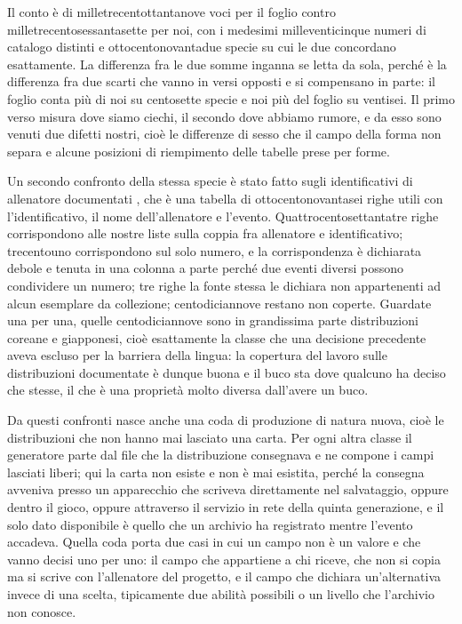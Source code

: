 Il conto è di milletrecentottantanove voci per il foglio contro milletrecentosessantasette per noi, con i medesimi milleventicinque numeri di catalogo distinti e ottocentonovantadue specie su cui le due concordano esattamente. La differenza fra le due somme inganna se letta da sola, perché è la differenza fra due scarti che vanno in versi opposti e si compensano in parte: il foglio conta più di noi su centosette specie e noi più del foglio su ventisei. Il primo verso misura dove siamo ciechi, il secondo dove abbiamo rumore, e da esso sono venuti due difetti nostri, cioè le differenze di sesso che il campo della forma non separa e alcune posizioni di riempimento delle tabelle prese per forme.

Un secondo confronto della stessa specie è stato fatto sugli identificativi di allenatore documentati \cite{bulbapedia-id-notevoli}, che è una tabella di ottocentonovantasei righe utili con l'identificativo, il nome dell'allenatore e l'evento. Quattrocentosettantatre righe corrispondono alle nostre liste sulla coppia fra allenatore e identificativo; trecentouno corrispondono sul solo numero, e la corrispondenza è dichiarata debole e tenuta in una colonna a parte perché due eventi diversi possono condividere un numero; tre righe la fonte stessa le dichiara non appartenenti ad alcun esemplare da collezione; centodiciannove restano non coperte. Guardate una per una, quelle centodiciannove sono in grandissima parte distribuzioni coreane e giapponesi, cioè esattamente la classe che una decisione precedente aveva escluso per la barriera della lingua: la copertura del lavoro sulle distribuzioni documentate è dunque buona e il buco sta dove qualcuno ha deciso che stesse, il che è una proprietà molto diversa dall'avere un buco.

Da questi confronti nasce anche una coda di produzione di natura nuova, cioè le distribuzioni che non hanno mai lasciato una carta. Per ogni altra classe il generatore parte dal file che la distribuzione consegnava e ne compone i campi lasciati liberi; qui la carta non esiste e non è mai esistita, perché la consegna avveniva presso un apparecchio che scriveva direttamente nel salvataggio, oppure dentro il gioco, oppure attraverso il servizio in rete della quinta generazione, e il solo dato disponibile è quello che un archivio ha registrato mentre l'evento accadeva. Quella coda porta due casi in cui un campo non è un valore e che vanno decisi uno per uno: il campo che appartiene a chi riceve, che non si copia ma si scrive con l'allenatore del progetto, e il campo che dichiara un'alternativa invece di una scelta, tipicamente due abilità possibili o un livello che l'archivio non conosce.

